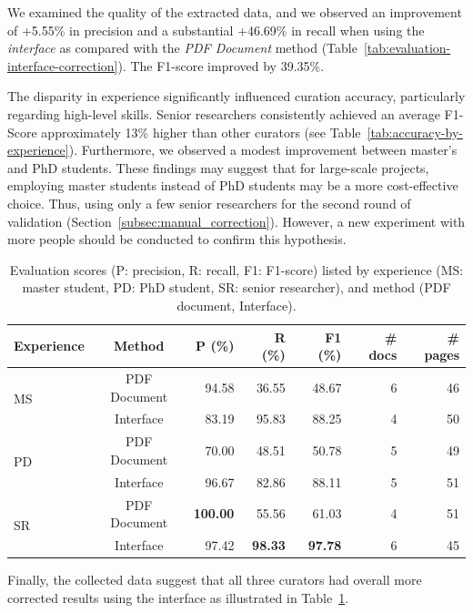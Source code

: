 We examined the quality of the extracted data, and we observed an improvement of +5.55\% in precision and a substantial +46.69\% in recall when using the \textit{interface} as compared with the \textit{PDF Document} method (Table~\ref{tab:evaluation-interface-correction}). 
The F1-score improved by 39.35\%.

The disparity in experience significantly influenced curation accuracy, particularly regarding high-level skills. Senior researchers consistently achieved an average F1-Score approximately 13\% higher than other curators (see Table~\ref{tab:accuracy-by-experience}). Furthermore, we observed a modest improvement between master's and PhD students. 
These findings may suggest that for large-scale projects, employing master students instead of PhD students may be a more cost-effective choice. Thus, using only a few senior researchers for the second round of validation (Section~\ref{subsec:manual_correction}).
However, a new experiment with more people should be conducted to confirm this hypothesis. 


\begin{table}[htbp]
\centering\small
\caption{Evaluation scores (P: precision, R: recall, F1: F1-score) listed by experience (MS: master student, PD: PhD student, SR: senior researcher), and method (PDF document, Interface). }
\begin{tabular}{lcrrrrr}
\toprule
\textbf{Experience} & \textbf{Method} & \textbf{P (\%)} & \textbf{R (\%)} & 
\textbf{F1 (\%)}  & \textbf{\# docs} & \textbf{\# pages}\\
\midrule
\multirow{2}{*}{MS} & PDF Document & 94.58 & 36.55 & 48.67 & 6 & 46 \\
 & Interface & 83.19 & 95.83 & 88.25 & 4 & 50 \\
\midrule
\multirow{2}{*}{PD} & PDF Document & 70.00 & 48.51 & 50.78 & 5 & 49 \\
 & Interface & 96.67 & 82.86 & 88.11 & 5 & 51\\
\midrule
\multirow{2}{*}{SR} & PDF Document & \textbf{100.00} & 55.56 & 61.03 & 4 & 51\\
 & Interface & 97.42 & \textbf{98.33} & \textbf{97.78} & 6 & 45\\
\bottomrule
\end{tabular}
\label{tab:accuracy-by-experience-method}
\end{table}

Finally, the collected data suggest that all three curators had overall more corrected results using the interface as illustrated in Table~\ref{tab:accuracy-by-experience-method}. 

